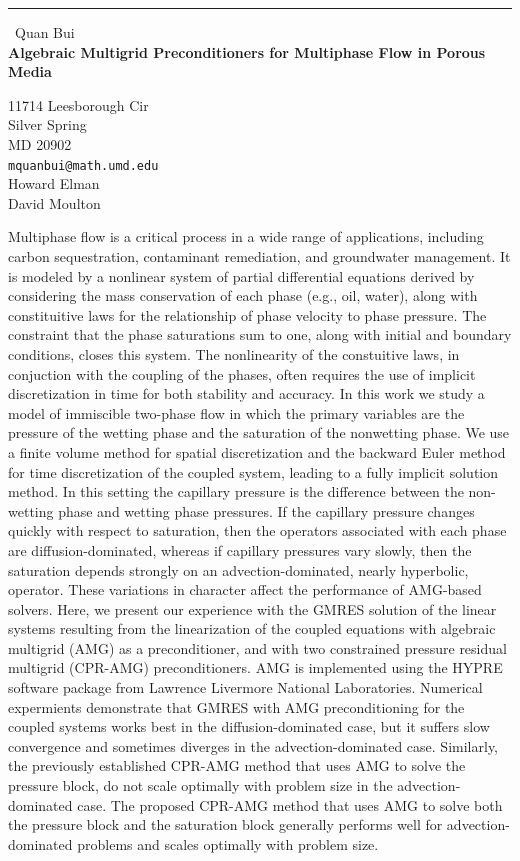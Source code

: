 \documentclass{report}
\begin{document}
\begin{center}
\rule{6in}{1pt} \
{\large Quan Bui \\
{\bf Algebraic Multigrid Preconditioners for Multiphase Flow in Porous Media}}

11714 Leesborough Cir \\ Silver Spring \\ MD 20902
\\
{\tt mquanbui@math.umd.edu}\\
Howard Elman\\
David Moulton\end{center}

Multiphase flow is a critical process in a wide range of applications,
including carbon sequestration, contaminant remediation, and groundwater
management. It is modeled by a nonlinear system of partial differential
equations derived by considering the mass conservation of each phase
(e.g., oil, water), along with constituitive laws for the relationship of
phase velocity to phase pressure. The constraint that the phase
saturations sum to one, along with initial and boundary conditions,
closes this system. The nonlinearity of the constuitive laws, in
conjuction with the coupling of the phases, often requires the use of
implicit discretization in time for both stability and accuracy. In this
work we study a model of immiscible two-phase flow in which the primary
variables are the pressure of the wetting phase and the saturation of the
nonwetting phase. We use a finite volume method for spatial
discretization and the backward Euler method for time discretization of
the coupled system, leading to a fully implicit solution method. In this
setting the capillary pressure is the difference between the non-wetting
phase and wetting phase pressures. If the capillary pressure changes
quickly with respect to saturation, then the operators associated with
each phase are diffusion-dominated, whereas if capillary pressures vary
slowly, then the saturation depends strongly on an advection-dominated,
nearly hyperbolic, operator. These variations in character affect the
performance of AMG-based solvers. Here, we present our experience with
the GMRES solution of the linear systems resulting from the linearization
of the coupled equations with algebraic multigrid (AMG) as a
preconditioner, and with two constrained pressure residual multigrid
(CPR-AMG) preconditioners. AMG is implemented using the HYPRE software
package from Lawrence Livermore National Laboratories. Numerical
expermients demonstrate that GMRES with AMG preconditioning for the
coupled systems works best in the diffusion-dominated case, but it
suffers slow convergence and sometimes diverges in the
advection-dominated case. Similarly, the previously established CPR-AMG
method that uses AMG to solve the pressure block, do not scale optimally
with problem size in the advection-dominated case. The proposed CPR-AMG
method that uses AMG to solve both the pressure block and the saturation
block generally performs well for advection-dominated problems and scales
optimally with problem size.
\end{document}
